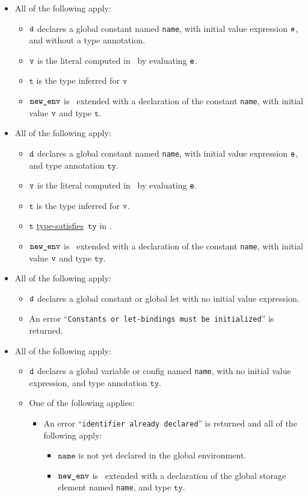\documentclass{book}
\newcommand\typesatisfies[0]{\hyperlink{def-typesatisfies}{type-satisfies}}
\newcommand\vt[0]{\texttt{t}}
\newcommand\tty[0]{\texttt{ty}}
\newcommand\name[0]{\texttt{name}}
\begin{document}
\begin{itemize}
  \item All of the following apply:
  \begin{itemize}
    \item $\texttt{d}$ declares a global constant named \name, with initial value expression $\texttt{e}$, and without a type annotation.
    \item $\texttt{v}$ is the literal computed in \tenv\ by evaluating $\texttt{e}$.
    \item $\vt$ is the type inferred for $\texttt{v}$
    \item $\texttt{new\_env}$ is \tenv\ extended with a declaration of the constant \name, with initial value $\texttt{v}$ and type $\vt$.
  \end{itemize}

  \item All of the following apply:
  \begin{itemize}
    \item $\texttt{d}$ declares a global constant named \name, with initial value expression $\texttt{e}$, and type annotation $\tty$.
    \item $\texttt{v}$ is the literal computed in \tenv\ by evaluating $\texttt{e}$.
    \item $\vt$ is the type inferred for $\texttt{v}$.
    \item $\vt$ \typesatisfies\  $\tty$ in \tenv.
    \item $\texttt{new\_env}$ is \tenv\ extended with a declaration of the constant \name, with initial value $\texttt{v}$ and type $\tty$.
  \end{itemize}

  \item All of the following apply:
  \begin{itemize}
    \item $\texttt{d}$ declares a global constant or global let with no initial value expression.
    \item An error ``\texttt{Constants or let-bindings must be initialized}'' is returned.
  \end{itemize}

  \item All of the following apply:
  \begin{itemize}
    \item $\texttt{d}$ declares a global variable or config named \name, with no initial value expression, and type annotation $\tty$.
    \item One of the following applies:
    \begin{itemize}
      \item An error ``\texttt{identifier already declared}'' is returned and all of the following apply:
      \begin{itemize}
        \item $\name$ is not yet declared in the global environment.
        \item $\texttt{new\_env}$ is \tenv\ extended with a declaration of the global storage element named \name, and type $\tty$.
      \end{itemize}
    \end{itemize}
  \end{itemize}


\end{itemize}
\end{document}
